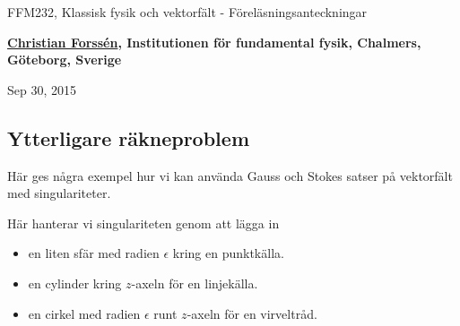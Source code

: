 \documentclass[%
oneside,                 %
final,                   %
10pt]{article}
\begin{document}






\thispagestyle{empty}

\begin{center}
{\LARGE\bf
\begin{spacing}{1.25}
FFM232, Klassisk fysik och vektorfält - Föreläsningsanteckningar
\end{spacing}
}
\end{center}


\begin{center}
{\bf \href{{http://fy.chalmers.se/subatom/nt/}}{Christian Forssén}, Institutionen för fundamental fysik, Chalmers, Göteborg, Sverige${}^{}$} \\ [0mm]
\end{center}

\begin{center}
\end{center}
    

\begin{center}
Sep 30, 2015
\end{center}

\vspace{1cm}


\subsection{Ytterligare räkneproblem}

Här ges några exempel hur vi kan använda Gauss och Stokes satser på vektorfält med singulariteter. 

Här hanterar vi singulariteten genom att lägga in 
\begin{itemize}
\item en liten sfär med radien $\epsilon$ kring en punktkälla.

\item en cylinder kring $z$-axeln för en linjekälla.

\item en cirkel med radien $\epsilon$ runt $z$-axeln för en virveltråd.
\end{itemize}
\end{document}
